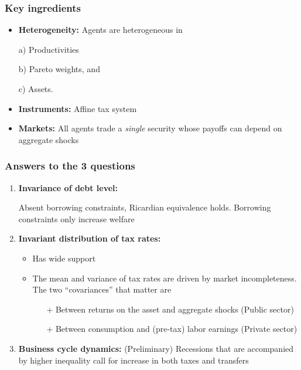 \documentclass{beamer}
\begin{document}
\begin{frame}
\frametitle{Key ingredients}


\begin{itemize}
\vspace{3mm}
 \item \textbf{Heterogeneity:} Agents are heterogeneous in 

 \vspace{2mm}
 a) Productivities 
 
 b) Pareto weights, and  
 
 c) Assets. 
 \vspace{3mm}
 \item \textbf{Instruments:} Affine tax system 
 \vspace{3mm}
 \item \textbf{Markets:} All agents trade a \emph{single} security whose payoffs can depend on aggregate shocks
\end{itemize}


\end{frame}

\begin{frame}
 \frametitle{Answers to the 3 questions}
 
\begin{enumerate}
\item \textbf{Invariance of  debt level:} 

Absent borrowing constraints, Ricardian equivalence holds. Borrowing constraints only increase welfare

\item \textbf{Invariant distribution of tax rates:} 

\begin{itemize}
	\item Has wide support
       \item The mean and variance of tax rates are driven by market incompleteness. The two ``covariances'' that matter are 
       \begin{itemize}
        \item [+]  Between returns on the asset and aggregate shocks (Public sector)
        \item [+]  Between consumption and (pre-tax) labor earnings (Private sector)
       \end{itemize}
\end{itemize}



\item \textbf{Business cycle dynamics:} (Preliminary) 
Recessions that are accompanied by higher inequality call for increase in both taxes and transfers
\end{enumerate}



\end{frame}
\end{document}
